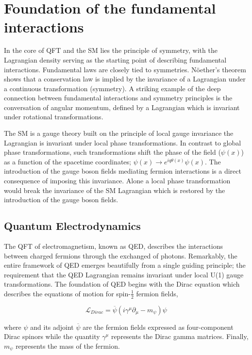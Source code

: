 \section{Foundation of the fundamental interactions}
\label{Section:Chapter1_FundamentalInteractions}

In the core of QFT and the SM lies the principle of symmetry, with the Lagrangian density serving as the starting point of describing fundamental interactions. Fundamental laws are closely tied to symmetries. N\"{o}ether's theorem shows that a conservation law is implied by the invariance of a Lagrangian under a continuous transformation (symmetry). A striking example of the deep connection between fundamental interactions and symmetry principles is the conversation of angular momentum, defined by a Lagrangian which is invariant under rotational transformations. 

The SM is a gauge theory built on the principle of local gauge invariance \ie the Lagrangian is invariant under local phase transformations. In contrast to global phase transformations, such transformations shift the phase of the field ($\psi(x)$) as a function of the spacetime coordinates; $\psi(x) \rightarrow e^{iq\theta(x)} \psi(x)$. The introduction of the gauge boson fields mediating fermion interactions is a direct consequence of imposing this invariance. Alone a local phase transformation would break the invariance of the SM Lagrangian which is restored by the introduction of the gauge boson fields.

\subsection{Quantum Electrodynamics}

The QFT of electromagnetism, known as \ac{QED}, describes the interactions between charged fermions through the exchanged of photons. Remarkably, the entire framework of QED emerges beautifully from a single guiding principle; the requirement that the QED Lagrangian remains invariant under local U(1) gauge transformations. The foundation of QED begins with the Dirac equation \cite{DiracEquation} which describes the equations of motion for spin-$\frac{1}{2}$ fermion fields,

\begin{equation}
    \mathcal{L}_{Dirac} = \overline{\psi}(i\gamma^\mu \partial_\mu - m_{\psi}) \psi
\label{Equation:Dirac}
\end{equation}

where $\psi$ and its adjoint $\overline{\psi}$ are the fermion fields expressed as four-component Dirac spinors while the quantity $\gamma^\mu$ represents the Dirac gamma matrices. Finally, $m_{\psi}$ represents the mass of the fermion.

